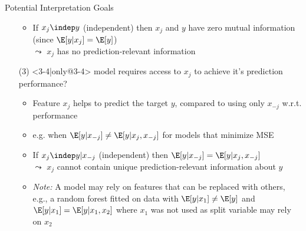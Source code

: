 \begin{frame}{Potential Interpretation Goals}
\begin{enumerate}
\begin{itemize}
      \item If $x_j \indep y$ (independent) then $x_j$ and $y$ have zero mutual information (since $\E[y|x_j] = \E[y]$)\\ %
      $\leadsto$ $x_j$ has no prediction-relevant information
    \end{itemize}
    \item[(3)]<3-4|only@3-4> model requires access to $x_j$ to achieve it's prediction performance?
    \begin{itemize}
      \item Feature $x_{j}$ helps to predict the target $y$, compared to using only $x_{-j}$ w.r.t. performance %
      \item e.g. when $\E[y|x_{-j}] \neq \E[y|x_j, x_{-j}]$ for models that minimize MSE
      \item If $x_j \indep y | x_{-j}$ (independent) then $\E[y|x_{-j}] = \E[y|x_j, x_{-j}]$ \\
      $\leadsto$ $x_j$ cannot contain unique prediction-relevant information about $y$
      \item  \textit{Note:} A model may rely on features that can be replaced with others, e.g., a random forest fitted on data with $\E[y|x_1] \neq \E[y]$ and $\E[y|x_1] = \E[y|x_1, x_2]$ where $x_1$ was not used as split variable may rely on $x_2$ %
    \end{itemize}
\end{enumerate}
\lz
{}
\end{frame}



